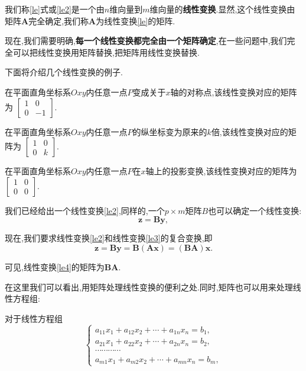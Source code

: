 我们称\eqref{le}式或\eqref{le2}是一个由$n$维向量到$m$维向量的\textbf{线性变换}.显然,这个线性变换由矩阵$\mathbf{A}$完全确定,我们称$\mathbf{A}$为线性变换\eqref{le}的矩阵.

现在,我们需要明确,\textbf{每一个线性变换都完全由一个矩阵确定},在一些问题中,我们完全可以把线性变换用矩阵替换,把矩阵用线性变换替换.

下面将介绍几个线性变换的例子.
\begin{example}
	在平面直角坐标系$Oxy$内任意一点$P$变成关于$x$轴的对称点,该线性变换对应的矩阵为
	$\begin{bmatrix}
			1 & 0  \\
			0 & -1
		\end{bmatrix} $.
\end{example}
\begin{example}
	在平面直角坐标系$Oxy$内任意一点$P$的纵坐标变为原来的$k$倍,该线性变换对应的矩阵为
	$\begin{bmatrix}
			1 & 0 \\
			0 & k
		\end{bmatrix} $.
\end{example}
\begin{example}
	在平面直角坐标系$Oxy$内任意一点$P$在$x$轴上的投影变换,该线性变换对应的矩阵为
	$\begin{bmatrix}
			1 & 0 \\
			0 & 0
		\end{bmatrix} $.
\end{example}

我们已经给出一个线性变换\eqref{le2},同样的,一个$p\times m$矩阵$B$也可以确定一个线性变换:
\begin{equation}
	\label{le3}
	\mathbf{z=By},
\end{equation}

现在,我们要求线性变换\eqref{le2}和线性变换\eqref{le3}的复合变换,即
\begin{equation}
	\label{le4}
	\mathbf{z=By=B(Ax)=(BA)x}.
\end{equation}

可见,线性变换\eqref{le4}的矩阵为$\mathbf{BA}$.

在这里我们可以看出,用矩阵处理线性变换的便利之处.同时,矩阵也可以用来处理线性方程组:

对于线性方程组
\begin{equation}
	\label{eq}
	\left\{\begin{matrix}
		a_{11}x_1+a_{12}x_2+\cdots+a_{1n}x_n=b_1, \\
		a_{21}x_1+a_{22}x_2+\cdots+a_{2n}x_n=b_2, \\
		\cdots\cdots\cdots\cdots                  \\
		a_{m1}x_1+a_{m2}x_2+\cdots+a_{mn}x_n=b_m,
	\end{matrix}\right.
\end{equation}

